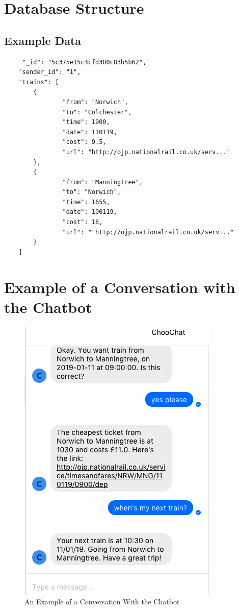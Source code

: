 \documentclass[12pt,a4paper]{article}
\begin{document}
    \begin{appendices}
    \section{Database Structure}
    \label{appendix:db_structure}
    \subsection{Example Data}
    \label{appendix_subsection:db_example_data}
    \begin{lstlisting}
     "_id": "5c375e15c3cfd380c83b5b62",
    "sender_id": "1",
    "trains": [
        {
                "from": "Norwich",
                "to": "Colchester",
                "time": 1900,
                "date": 110119,
                "cost": 9.5,
                "url": "http://ojp.nationalrail.co.uk/serv..."
        },
        {
                "from": "Manningtree",
                "to": "Norwich",
                "time": 1655,
                "date": 100119,
                "cost": 18,
                "url": ""http://ojp.nationalrail.co.uk/serv..."
        }
    ]
    \end{lstlisting}
    
    \newpage
    
    \section{Example of a Conversation with the Chatbot}
    \label{appendix:chatbot_conversation}
    \begin{figure}[H]
        \centering
        \includegraphics[scale=0.8]{Images/example_convo.png}
        \caption{An Example of a Conversation With the Chatbot}
        \label{fig:my_label}
    \end{figure}
    \end{appendices}
    
\end{document}
